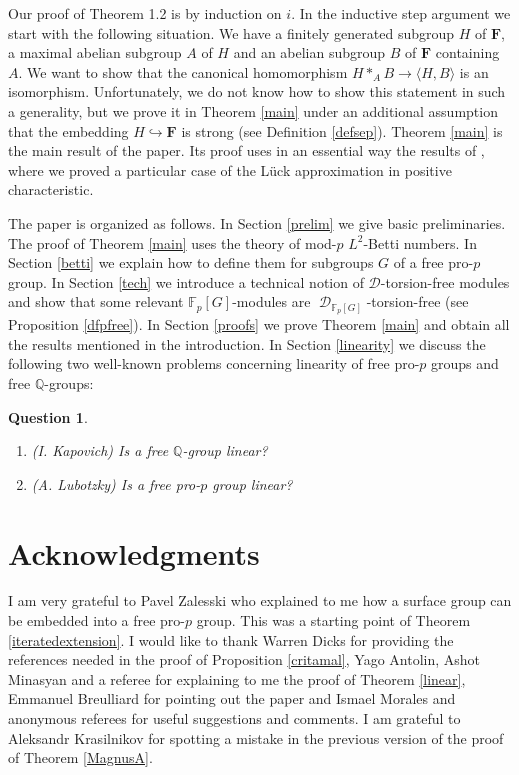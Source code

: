 \documentclass[11pt]{amsart}
\newtheorem{Question}[lem]{Question}
\numberwithin{claimcounter}{lem}
\DeclareMathOperator{\D}{\mathcal D}
\newcommand{\F}{\mathbb{F}}
\newcommand{\Q}{\mathbb{Q}}
\begin{document}
 
Our proof of Theorem 1.2 is by induction on $i$. In the inductive step argument we start with the following situation. We have  a finitely generated subgroup $H$ of $\mathbf F$, a maximal abelian subgroup $A$ of $H$ and an abelian subgroup $B$ of $\mathbf F$ containing $A$. We want to show that the canonical homomorphism $H*_AB\to\langle H,B\rangle$ is an isomorphism. Unfortunately, we do not know how to show this statement  in such a generality, but we prove it in Theorem \ref{main} under an  additional assumption  that the embedding $H\hookrightarrow \mathbf F$ is strong (see Definition \ref{defsep}). Theorem \ref{main} is the main result of the paper. Its proof uses in an essential way the results of \cite{Jataylor19}, where we proved a particular case of the L\"uck approximation in positive characteristic. 

 

 The paper is organized as follows. In Section \ref{prelim} we give basic preliminaries.
 The proof of  Theorem \ref {main} uses the theory of   mod-$p$ $L^2$-Betti numbers. In Section \ref{betti} we explain how to define them for subgroups  $G$ of a free pro-$p$ group. In Section \ref{tech} we introduce a technical notion of $\mathcal D$-torsion-free modules and show that some relevant $\F_p[G]$-modules are $\D_{\F_p[G]}$-torsion-free (see Proposition \ref{dfpfree}). In Section \ref{proofs} we prove Theorem \ref{main} and obtain  all the results mentioned in the introduction. In Section \ref{linearity}
 we discuss the following  two well-known problems  concerning linearity of free pro-$p$ groups and free $\Q$-groups:
 
 \begin{Question} \begin{enumerate}
 \
  \item (I. Kapovich) Is a free $\Q$-group linear?
 \item (A. Lubotzky)  Is a free pro-$p$ group linear?

 
 \end{enumerate}
\end{Question} 

 
   
 
\section*{Acknowledgments}

I am very grateful to Pavel Zalesski who explained to me how   a surface group can be embedded  into a free pro-$p$ group. This was a starting point of Theorem \ref{iteratedextension}.
I would  like to thank Warren Dicks for providing the references needed in the proof of Proposition \ref{critamal}, Yago Antolin, Ashot Minasyan and a referee for explaining to me the proof of Theorem \ref{linear}, Emmanuel Breulliard for pointing out  the paper \cite{BG10} and Ismael Morales and anonymous  referees for  useful  suggestions and comments.  I am grateful to Aleksandr Krasilnikov for spotting a mistake in the previous version of the proof of Theorem \ref{MagnusA}.
\end{document}
